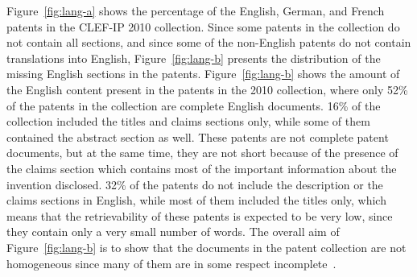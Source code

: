Figure~\ref{fig:lang-a} shows the percentage of the English, German, and French patents in the CLEF-IP 2010 collection. Since some patents in the collection do not contain all sections, and since some of the non-English patents do not contain translations into English, Figure~\ref{fig:lang-b} presents the distribution of the missing English sections in the patents. Figure~\ref{fig:lang-b} shows the amount of the English content present in the patents in the 2010 collection, where only 52\% of the patents in the collection are complete English documents. 16\% of the collection included the titles and claims sections only, while some of them contained the abstract section as well. These patents are not complete patent documents, but at the same time, they are not short because of the presence of the claims section which contains most of the important information about the invention disclosed. 32\% of the patents do not include the description or the claims sections in English, while most of them included the titles only, which means that the retrievability of these patents is expected to be very low, since they contain only a very small number of words. The overall aim of Figure~\ref{fig:lang-b} is to show that the documents in the patent collection are not homogeneous since many of them are in some respect incomplete~\citep{magdy2012toward}.
